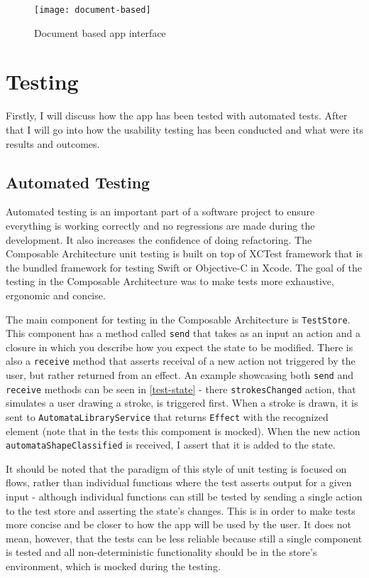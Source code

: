 \begin{figure}
    \texttt{[image: document-based]}
    \caption{Document based app interface}\label{document-based-interface}
\end{figure}

\chapter{Testing}
\label{chap:testing}

Firstly, I will discuss how the app has been tested with automated tests. After that I will go into how the usability testing has been conducted and what were its results and outcomes.

\section{Automated Testing}

Automated testing is an important part of a software project to ensure everything is working correctly and no regressions are made during the development. It also increases the confidence of doing refactoring. The Composable Architecture unit testing is built on top of XCTest framework that is the bundled framework for testing Swift or Objective-C in Xcode. The goal of the testing in the Composable Architecture was to make tests more exhaustive, ergonomic and concise.

The main component for testing in the Composable Architecture is \lstinline{TestStore}. This component has a method called \lstinline{send} that takes as an input an action and a closure in which you describe how you expect the state to be modified. There is also a \lstinline{receive} method that asserts receival of a new action not triggered by the user, but rather returned from an effect. An example showcasing both \lstinline{send} and \lstinline{receive} methods can be seen in \ref{test-state} - there \lstinline{strokesChanged} action, that simulates a user drawing a stroke, is triggered first. When a stroke is drawn, it is sent to \lstinline{AutomataLibraryService} that returns \lstinline{Effect} with the recognized element (note that in the tests this compoment is mocked). When the new action \lstinline{automataShapeClassified} is received, I assert that it is added to the state.

It should be noted that the paradigm of this style of unit testing is focused on flows, rather than individual functions where the test asserts output for a given input - although individual functions can still be tested by sending a single action to the test store and asserting the state's changes. This is in order to make tests more concise and be closer to how the app will be used by the user. It does not mean, however, that the tests can be less reliable because still a single component is tested and all non-deterministic functionality should be in the store's environment, which is mocked during the testing. 

